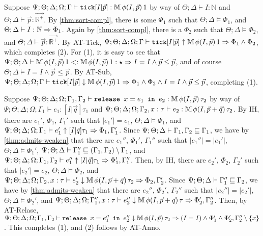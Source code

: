   
  \item[(T-Tick)] Suppose $\Psi ; \Theta ; \Delta ; \Omega ; \Gamma \vdash \texttt{tick}[I|\vec{p}] : \mathbb{M} \, \phi(I,\vec{p})\, 1$ by way of
  $\Theta ; \Delta \vdash I : \mathbb{N}$ and
  $\Theta ; \Delta \vdash \vec{p} : \vec{\mathbb{R}^+}$.
  By \autoref{thm:sort-compl}, there is some $\Phi_1$ such that
  $\Theta ; \Delta \vDash \Phi_1$, and
  $\Theta ; \Delta \vdash I : \mathbb{N} \Rightarrow \Phi_1$.
  Again by \autoref{thm:sort-compl}, there is a $\Phi_2$ such that
  $\Theta ; \Delta \vDash \Phi_2$, and
  $\Theta ; \Delta \vdash \vec{p} : \vec{\mathbb{R}^+}$.
  By AT-Tick,
  $\Psi ; \Theta ; \Delta ; \Omega ; \Gamma \vdash \texttt{tick}[I|\vec{p}] \uparrow \mathbb{M} \, \phi(I,\vec{p})\, 1 \Rightarrow \Phi_1 \wedge \Phi_2$,
  which completes (2).
  For (1), it is easy to see that $\Psi ; \Theta ; \Delta \vdash \mathbb{M} \, \phi(I,\vec{p})\, 1 <: \mathbb{M} \, \phi(I,\vec{p})\, 1 : \star \Rightarrow I = I \wedge \vec{p} \leq \vec{p}$, and of course $\Theta ; \Delta \vDash I = I \wedge \vec{p} \leq \vec{p}$.
  By AT-Sub,
  $\Psi ; \Theta ; \Delta ; \Omega ; \Gamma \vdash \texttt{tick}[I|\vec{p}] \downarrow \mathbb{M} \, \phi(I,\vec{p})\, 1 \Rightarrow \Phi_1 \wedge \Phi_2 \wedge  I = I \wedge \vec{p} \leq \vec{p}$, completing (1).
  
  \item[(T-Release)] Suppose
  $\Psi ; \Theta ; \Delta ; \Omega ; \Gamma_1,\Gamma_2 \vdash \texttt{release } x = e_1 \texttt{ in }e_2 : \mathbb{M} \, \phi(I,\vec{p}) \, \tau_2$ by way of
  $\Psi ; \Theta ; \Delta ; \Omega ; \Gamma_1 \vdash e_1 : [I | \vec{q}] \tau_1$ and
  $\Psi ; \Theta ; \Delta ; \Omega ; \Gamma_2, x : \tau \vdash e_2 : \mathbb{M} \, \phi(I,\vec{p} + \vec{q}) \, \tau_2$.
  By IH, there are $e_1'$, $\Phi_1$, $\Gamma_1'$ such that
  $|e_1'| = e_1$,
  $\Theta ; \Delta \vDash \Phi_1$, and
  $\Psi ; \Theta ; \Delta ; \Omega ; \Gamma_1 \vdash e_1' \uparrow [I|\vec{q}] \tau_1 \Rightarrow \Phi_1,\Gamma_1'$.
  Since $\Psi ; \Theta ;\Delta \vdash \Gamma_1,\Gamma_2 \sqsubseteq \Gamma_1$, we have by \autoref{thm:admits-weaken} that there are $e_1''$, $\Phi_1'$, $\Gamma_1''$ such that
  $|e_1''| = |e_1'|$,
  $\Theta ; \Delta \vDash \Phi_1'$,
  $\Psi ; \Theta ; \Delta \vdash \Gamma_1'' \sqsubseteq (\Gamma_1,\Gamma_2) \setminus \Gamma_1$, and
  $\Psi ; \Theta ; \Delta ; \Omega ; \Gamma_1,\Gamma_2 \vdash e_1'' \uparrow [I|\vec{q}] \tau_1 \Rightarrow \Phi_1',\Gamma_1''$.
  Then, by IH, there are $e_2'$, $\Phi_2$, $\Gamma_2'$ such that
  $|e_2'| = e_2$,
  $\Theta ; \Delta \vDash \Phi_2$, and
  $\Psi ; \Theta ; \Delta ; \Omega ; \Gamma_2, x : \tau \vdash e_2' \downarrow \mathbb{M} \, \phi(I,\vec{p} + \vec{q}) \, \tau_2 \Rightarrow \Phi_2,\Gamma_2'$.
  Since $\Psi ; \Theta ; \Delta \vdash \Gamma_1'' \sqsubseteq \Gamma_2$,
  we have by \autoref{thm:admits-weaken} that there are $e_2''$, $\Phi_2'$, $\Gamma_2''$ such that
  $|e_2''| = |e_2'|$,
  $\Theta ; \Delta \vDash \Phi_2'$, and
  $\Psi ; \Theta ; \Delta ; \Omega ; \Gamma_1'', x : \tau \vdash e_2'' \downarrow \mathbb{M} \, \phi(I,\vec{p} + \vec{q}) \, \tau \Rightarrow \Phi_2',\Gamma_2''$.
  Then, by AT-Relase,
  $\Psi ; \Theta ; \Delta ; \Omega ; \Gamma_1,\Gamma_2 \vdash \texttt{release } x = e_1'' \texttt{ in }e_2'' \downarrow \mathbb{M} \, \phi(I,\vec{p}) \, \tau_2 \Rightarrow (I = I) \wedge \Phi_1' \wedge \Phi_2',\Gamma_2'' \setminus \{x\}$.
  This completes (1), and (2) follows by AT-Anno.
  
